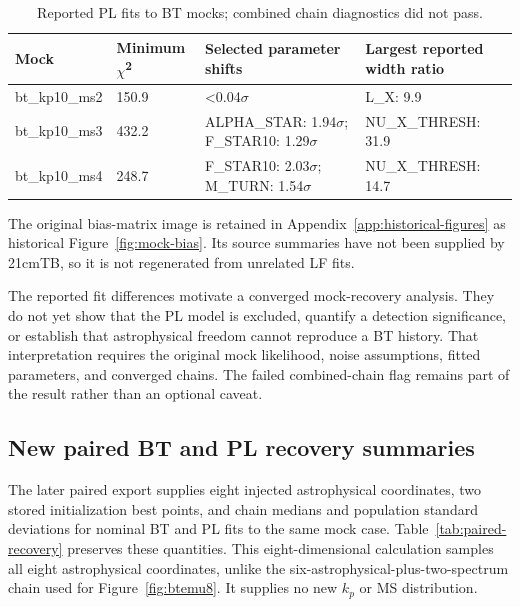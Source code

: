 \begin{table}[t]
\caption{Reported PL fits to BT mocks; combined chain diagnostics did not pass.}
\label{tab:mock-summary}
\centering\small
\begin{tabular}{p{}p{}p{}p{}}
\toprule
Mock & Minimum \(\chi\)\textsuperscript{2} & Selected parameter shifts & Largest reported width ratio \\
\midrule
bt\_kp10\_ms2 & 150.9 & \textless0.04\(\sigma\) & L\_X: 9.9 \\
bt\_kp10\_ms3 & 432.2 & ALPHA\_STAR: 1.94\(\sigma\); F\_STAR10: 1.29\(\sigma\) & NU\_X\_THRESH: 31.9 \\
bt\_kp10\_ms4 & 248.7 & F\_STAR10: 2.03\(\sigma\); M\_TURN: 1.54\(\sigma\) & NU\_X\_THRESH: 14.7 \\
\bottomrule
\end{tabular}
\end{table}

The original bias-matrix image is retained in Appendix~\ref{app:historical-figures} as historical Figure~\ref{fig:mock-bias}. Its source summaries have not been supplied by 21cmTB, so it is not regenerated from unrelated LF fits.

The reported fit differences motivate a converged mock-recovery analysis. They do not yet show that the PL model is excluded, quantify a detection significance, or establish that astrophysical freedom cannot reproduce a BT history. That interpretation requires the original mock likelihood, noise assumptions, fitted parameters, and converged chains. The failed combined-chain flag remains part of the result rather than an optional caveat.

\subsection{New paired BT and PL recovery summaries}\label{paired-recovery-update}

The later paired export supplies eight injected astrophysical coordinates, two stored initialization best points, and chain medians and population standard deviations for nominal BT and PL fits to the same mock case. Table~\ref{tab:paired-recovery} preserves these quantities. This eight-dimensional calculation samples all eight astrophysical coordinates, unlike the six-astrophysical-plus-two-spectrum chain used for Figure~\ref{fig:btemu8}. It supplies no new $k_p$ or MS distribution.

